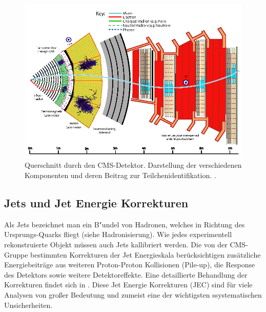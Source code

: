 \begin{figure}[ht]
	\centering
	\includegraphics[scale=0.45]{LHC/cms_particle_identification}
	\caption[CMS im Querschnitt]{Querschnitt durch den CMS-Detektor. Darstellung der verschiedenen Komponenten und deren Beitrag zur Teilchenidentifikation. \cite{Sirunyan:2270046}.}
	\label{cernkomplex}
\end{figure}
\clearpage
\subsection{Jets und Jet Energie Korrekturen} 
Als Jets bezeichnet man ein B"undel von Hadronen, welches in Richtung des Ursprungs-Quarks fliegt (siehe Hadronisierung). Wie jedes experimentell rekonstruierte Objekt m\"ussen auch Jets kallibriert werden.
Die von der CMS-Gruppe bestimmten Korrekturen der Jet Energieskala ber\"ucksichtigen zusätzliche Energiebeitr\"age aus weiteren Proton-Proton Kollisionen (Pile-up), die Response des Detektors sowie
weitere Detektoreffekte. Eine detaillierte Behandlung der Korrekturen findet sich in \cite{Khachatryan:2016kdb}. Diese Jet Energie Korrekturen (JEC) sind f\"ur viele Analysen von gro\ss{}er Bedeutung und zumeist eine der wichtigsten ssystematischen Unsicherheiten.  



